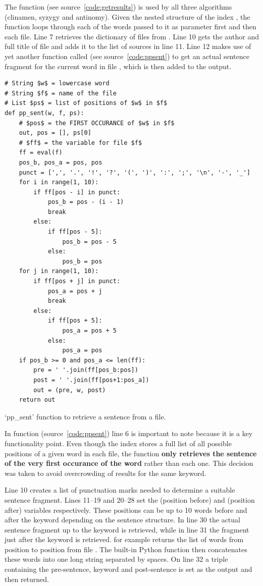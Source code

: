 The  function (see source~\ref{code:getresults}) is used by all three algorithms (clinamen, syzygy and antinomy). Given the nested structure of the index , the function loops through each of the words passed to it as parameter  first and then each file. Line 7 retrieves the dictionary of files from . Line 10 gets the author and full title of file  and adds it to the list of sources in line 11. Line 12 makes use of yet another function called  (see source~\ref{code:ppsent}) to get an actual sentence fragment for the current word  in file , which is then added to the output.

\begin{listing}
  \begin{verbatim}
# String $w$ = lowercase word
# String $f$ = name of the file
# List $ps$ = list of positions of $w$ in $f$
def pp_sent(w, f, ps):
    # $pos$ = the FIRST OCCURANCE of $w$ in $f$
    out, pos = [], ps[0]
    # $ff$ = the variable for file $f$
    ff = eval(f)
    pos_b, pos_a = pos, pos
    punct = [',', '.', '!', '?', '(', ')', ':', ';', '\n', '-', '_']
    for i in range(1, 10):
        if ff[pos - i] in punct:
            pos_b = pos - (i - 1)
            break
        else:
            if ff[pos - 5]:
                pos_b = pos - 5
            else:
                pos_b = pos
    for j in range(1, 10):
        if ff[pos + j] in punct:
            pos_a = pos + j
            break
        else:
            if ff[pos + 5]:
                pos_a = pos + 5
            else:
                pos_a = pos
    if pos_b >= 0 and pos_a <= len(ff):
        pre = ' '.join(ff[pos_b:pos])
        post = ' '.join(ff[pos+1:pos_a])
        out = (pre, w, post)
    return out
  \end{verbatim}
\caption{`pp\_sent' function to retrieve a sentence from a file.}
\label{code:ppsent}
\end{listing}

In function  (source~\ref{code:ppsent}) line 6 is important to note because it is a key functionality point. Even though the index  stores a full list of all possible positions of a given word in each file, the  function \textbf{only retrieves the sentence of the very first occurance of the word} rather than each one. This decision was taken to avoid overcrowding of results for the same keyword.

Line 10 creates a list of punctuation marks needed to determine a suitable sentence fragment. Lines 11--19 and 20--28 set the  (position before) and  (position after) variables respectively. These positions can be up to 10 words before and after the keyword  depending on the sentence structure. In line 30 the actual sentence fragment up to the keyword is retrieved, while in line 31 the fragment just after the keyword is retrieved.  for example returns the list of words from position  to position  from file . The built-in Python  function then concatenates these words into one long string separated by spaces. On line 32 a triple containing the pre-sentence, keyword and post-sentence is set as the output and then returned.

